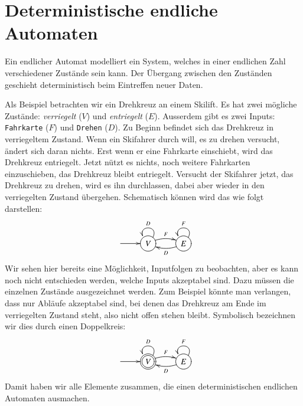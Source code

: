 \section{Deterministische endliche Automaten\label{regulaer:dea}}
Ein endlicher Automat modelliert ein System, welches
in einer endlichen Zahl verschiedener Zustände sein kann.
Der Übergang zwischen den Zuständen geschieht deterministisch beim
Eintreffen neuer Daten.

Als Beispiel betrachten wir ein Drehkreuz an einem Skilift.
Es hat zwei mögliche Zustände: {\it  verriegelt} ($V$)
und  {\it entriegelt} ($E$).
Ausserdem gibt es zwei Inputs: {\tt Fahrkarte} ($F$)
und {\tt Drehen} ($D$).
Zu Beginn befindet sich das Drehkreuz in verriegeltem Zustand.
Wenn ein Skifahrer durch will, es zu drehen
versucht, ändert sich daran nichts.
Erst wenn er eine Fahrkarte einschiebt,
wird das Drehkreuz entriegelt.
Jetzt nützt es nichts, noch weitere
Fahrkarten einzuschieben, das Drehkreuz bleibt entriegelt.
Versucht der Skifahrer jetzt, das Drehkreuz zu drehen, wird es
ihn durchlassen, dabei aber wieder in den verriegelten Zustand übergehen.
Schematisch können wird das wie folgt darstellen:
\[
\entrymodifiers={++[o][F]}
\xymatrix{
*+\txt{} \ar[r]
	&{V}\ar@/^/[r]^{F} \ar@(ur,ul)_{D}
		&{E}\ar@/^/[l]^{D} \ar@(ur,ul)_{F}
}
\]
Wir sehen hier bereits eine Möglichkeit, Inputfolgen zu beobachten, 
aber es kann noch nicht entschieden werden, welche Inputs akzeptabel
sind.
Dazu müssen die einzelnen Zustände ausgezeichnet werden.
Zum Beispiel könnte man verlangen, dass nur Abläufe akzeptabel
sind, bei denen das Drehkreuz am Ende im verriegelten Zustand steht,
also nicht offen stehen bleibt.
Symbolisch bezeichnen wir dies durch einen Doppelkreis:
\[
\entrymodifiers={++[o][F]}
\xymatrix{
*+\txt{} \ar[r]
	&*++[o][F=]{V}\ar@/^/[r]^{F} \ar@(ur,ul)_{D}
		&{E}\ar@/^/[l]^{D} \ar@(ur,ul)_{F}
}
\]
Damit haben wir alle Elemente zusammen, die einen deterministischen
endlichen Automaten ausmachen.
